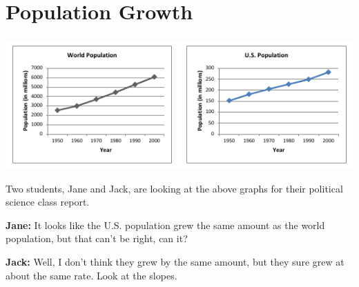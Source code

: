 \documentclass[notheorems
          ]
          {beamer}
\begin{document}
\section{Population Growth} 



\begin{frame}
 \frametitle {   }
 \begin{center}
 \includegraphics[width=1\textwidth]{img/population_growth.png}
\end{center}

\small{
Two students, Jane and Jack, are looking at the above graphs for their political science 
class report.

\textbf{Jane:}  It looks like the U.S. population grew the same amount as the world population, but that can’t be right, can it?

\textbf{Jack:}  Well, I don’t think they grew by the same amount, but they sure grew at about the same rate. Look at the slopes.
}
 

\end{frame}
\end{document}
